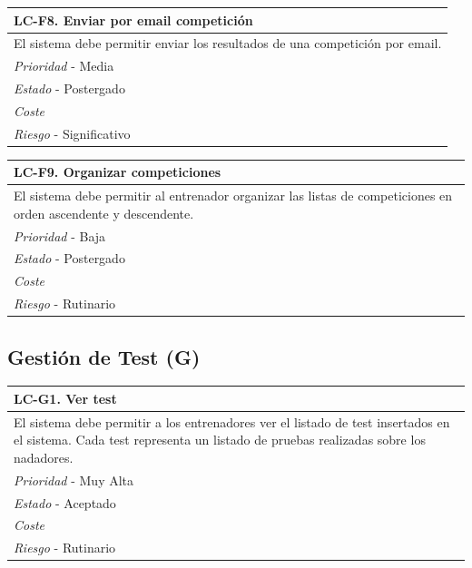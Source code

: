 	\begin{center}
		\begin{tabularx}{15cm}{|X|}
			\hline 
				\bf{LC-F8. Enviar por email competición}\\
			\hline
				El sistema debe permitir enviar los resultados de una competición por email.\\
			\hline
				{\it Prioridad} - Media\\
			\hline
				{\it Estado} - Postergado\\
			\hline
				{\it Coste}\\
			\hline
				{\it Riesgo} - Significativo\\
			\hline
		\end{tabularx}
	\end{center}
	
	\begin{center}
		\begin{tabularx}{15cm}{|X|}
			\hline 
				\bf{LC-F9. Organizar competiciones}\\
			\hline
				El sistema debe permitir al entrenador organizar las listas de competiciones en orden ascendente y descendente.\\
			\hline
				{\it Prioridad} - Baja\\
			\hline
				{\it Estado} - Postergado\\
			\hline
				{\it Coste}\\
			\hline
				{\it Riesgo} - Rutinario\\
			\hline
		\end{tabularx}
	\end{center}
	

%
%
\subsection{Gestión de Test (G)} %
	\label{sub:gestion_de_test}

	\begin{center}
		\begin{tabularx}{15cm}{|X|}
			\hline 
				\bf{LC-G1. Ver test}\\
			\hline
				El sistema debe permitir a los entrenadores ver el listado de test insertados en el sistema. Cada test representa un listado de pruebas realizadas sobre los nadadores.\\
			\hline
				{\it Prioridad} - Muy Alta\\
			\hline
				{\it Estado} - Aceptado\\
			\hline
				{\it Coste}\\
			\hline
				{\it Riesgo} - Rutinario\\
			\hline
		\end{tabularx}
	\end{center}
	
